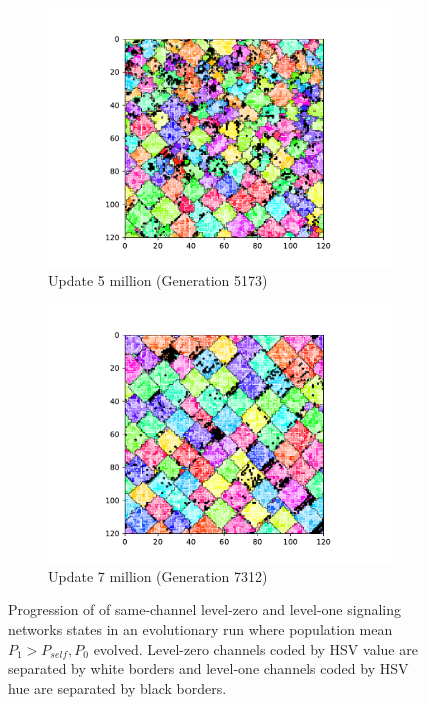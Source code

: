 \begin{figure}[t]
\begin{center}
\begin{subfigure}[b]{0.5\columnwidth}
  \includegraphics[width=\columnwidth,trim={2.5cm 0.5cm 2.5cm 1cm},clip]{img/ChannelMap_1011_update5000000}
  \caption{Update 5 million (Generation 5173)}
  \label{fig:ChannelMap_1011_update5000000}
\end{subfigure}%
\begin{subfigure}[b]{0.5\columnwidth}
  \includegraphics[width=\columnwidth,trim={2.5cm 0.5cm 2.5cm 1cm},clip]{img/ChannelMap_1011_update7000000}
  \caption{Update 7 million (Generation 7312)}
  \label{fig:ChannelMap_1011_update7000000}
\end{subfigure}
\caption{
Progression of of same-channel level-zero and level-one signaling networks states in an evolutionary run where population mean $P_1 > P_{self}, P_0$ evolved.
Level-zero channels coded by HSV value are separated by white borders and level-one channels coded by HSV hue are separated by black borders.
}
\label{fig:grid_progression}
\end{center}
\end{figure}
